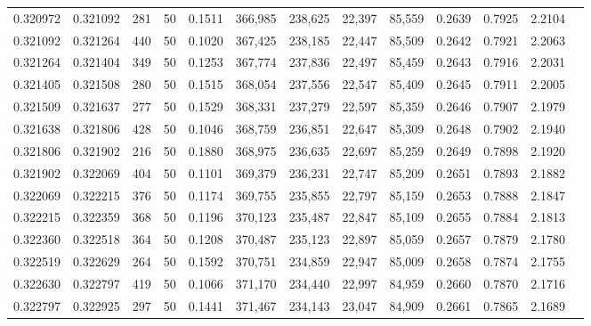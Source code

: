 \begin{tabular}{rrrrrrrrrrrrr}
0.320972 & 0.321092 &   281 &  50 &                                     0.1511 & 366,985 & 238,625 &  22,397 &  85,559 & 0.2639 & 0.7925 & 2.2104 \\
0.321092 & 0.321264 &   440 &  50 &                                     0.1020 & 367,425 & 238,185 &  22,447 &  85,509 & 0.2642 & 0.7921 & 2.2063 \\
0.321264 & 0.321404 &   349 &  50 &                                     0.1253 & 367,774 & 237,836 &  22,497 &  85,459 & 0.2643 & 0.7916 & 2.2031 \\
0.321405 & 0.321508 &   280 &  50 &                                     0.1515 & 368,054 & 237,556 &  22,547 &  85,409 & 0.2645 & 0.7911 & 2.2005 \\
0.321509 & 0.321637 &   277 &  50 &                                     0.1529 & 368,331 & 237,279 &  22,597 &  85,359 & 0.2646 & 0.7907 & 2.1979 \\
0.321638 & 0.321806 &   428 &  50 &                                     0.1046 & 368,759 & 236,851 &  22,647 &  85,309 & 0.2648 & 0.7902 & 2.1940 \\
0.321806 & 0.321902 &   216 &  50 &                                     0.1880 & 368,975 & 236,635 &  22,697 &  85,259 & 0.2649 & 0.7898 & 2.1920 \\
0.321902 & 0.322069 &   404 &  50 &                                     0.1101 & 369,379 & 236,231 &  22,747 &  85,209 & 0.2651 & 0.7893 & 2.1882 \\
0.322069 & 0.322215 &   376 &  50 &                                     0.1174 & 369,755 & 235,855 &  22,797 &  85,159 & 0.2653 & 0.7888 & 2.1847 \\
0.322215 & 0.322359 &   368 &  50 &                                     0.1196 & 370,123 & 235,487 &  22,847 &  85,109 & 0.2655 & 0.7884 & 2.1813 \\
0.322360 & 0.322518 &   364 &  50 &                                     0.1208 & 370,487 & 235,123 &  22,897 &  85,059 & 0.2657 & 0.7879 & 2.1780 \\
0.322519 & 0.322629 &   264 &  50 &                                     0.1592 & 370,751 & 234,859 &  22,947 &  85,009 & 0.2658 & 0.7874 & 2.1755 \\
0.322630 & 0.322797 &   419 &  50 &                                     0.1066 & 371,170 & 234,440 &  22,997 &  84,959 & 0.2660 & 0.7870 & 2.1716 \\
0.322797 & 0.322925 &   297 &  50 &                                     0.1441 & 371,467 & 234,143 &  23,047 &  84,909 & 0.2661 & 0.7865 & 2.1689 \\

\end{tabular}
